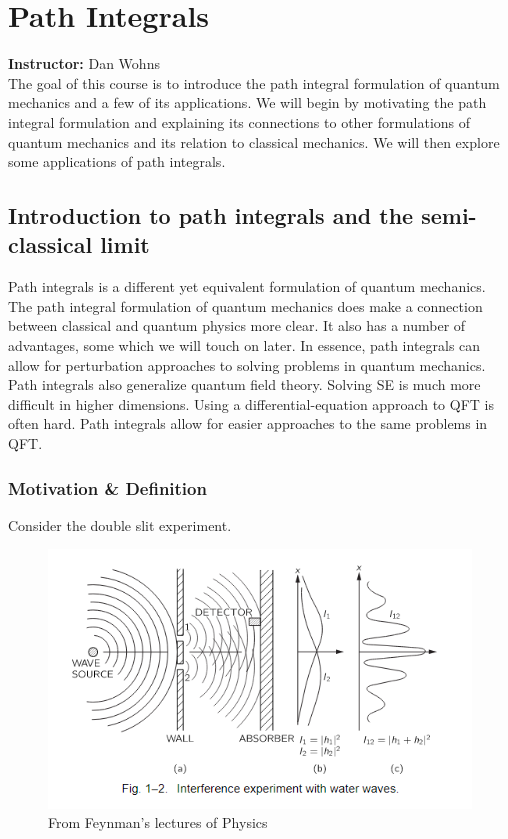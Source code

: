 \documentclass{book}
\theoremstyle{definition}
\begin{document}
\chapter{Path Integrals}

\textbf{Instructor:} Dan Wohns\\

The goal of this course is to introduce the path integral formulation of quantum mechanics and a few of its applications. We will begin by motivating the path integral formulation and explaining its connections to other formulations of quantum mechanics and its relation to classical mechanics. We will then explore some applications of path integrals.


\newpage

\section{Introduction to path integrals and the semi-classical limit}

Path integrals is a different yet equivalent formulation of quantum mechanics. The path integral formulation of quantum mechanics does make a connection between classical and quantum physics more clear. It also has a number of advantages, some which we will touch on later. In essence, path integrals can allow for perturbation approaches to solving problems in quantum mechanics. Path integrals also generalize quantum field theory. Solving SE is much more difficult in higher dimensions. Using a differential-equation approach to QFT is often hard. Path integrals allow for easier approaches to the same problems in QFT. \\


\subsection{Motivation \& Definition}

Consider the double slit experiment. 
\begin{figure}[!htb]
	\centering
	\includegraphics[scale=0.8]{double-slit}
	\caption{From Feynman's lectures of Physics}
\end{figure}
\end{document}
